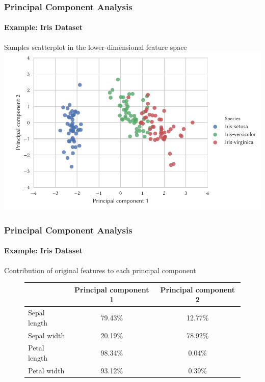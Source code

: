 \documentclass[12pt,a4paper,xcolor=dvipsnames,xcolor=table]{beamer}
\begin{document}
\begin{frame}[t]
    \frametitle{Principal Component Analysis}
    \framesubtitle{Example: Iris Dataset}
    Samples scatterplot in the lower-dimensional feature space
    \includegraphics[width=1\textwidth]{fig/iris_principal_components_scatter}
\end{frame}

\begin{frame}
    \frametitle{Principal Component Analysis}
    \framesubtitle{Example: Iris Dataset}
    Contribution of original features to each principal component 
    \centering
    \begin{figure}
        \begin{tabular}{|l|c|c|}
            \hline
            & Principal component 1 & Principal component 2\\
            \hline
            \hline
            Sepal length & 79.43\% & 12.77\% \\
            Sepal width & 20.19\% & 78.92\% \\
            Petal length & 98.34\% & 0.04\% \\
            Petal width & 93.12\% & 0.39\% \\
            \hline
        \end{tabular}
    \end{figure}
\end{frame}
\end{document}
